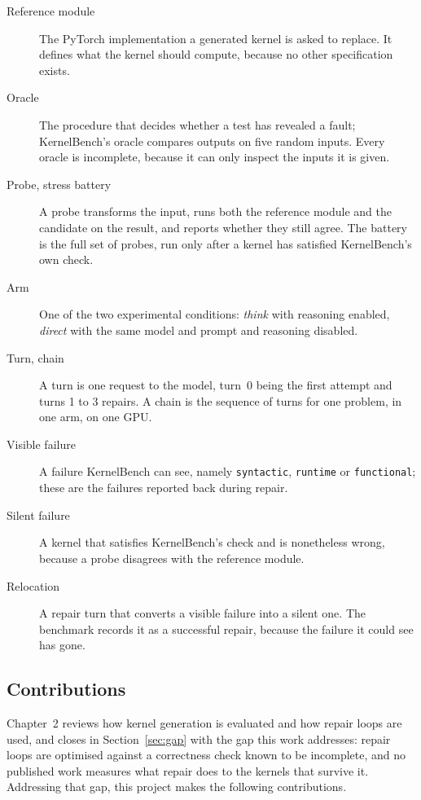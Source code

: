 \documentclass[12pt]{article}
\begin{document}
\begin{description}

\item[Reference module] The PyTorch implementation a generated kernel is asked
to replace. It defines what the kernel should compute, because no other
specification exists.

\item[Oracle] The procedure that decides whether a test has revealed a fault;
KernelBench's oracle compares outputs on five random inputs. Every oracle is
incomplete, because it can only inspect the inputs it is given.

\item[Probe, stress battery] A probe transforms the input, runs both the
reference module and the candidate on the result, and reports whether they
still agree. The battery is the full set of probes, run only after a kernel has
satisfied KernelBench's own check.

\item[Arm] One of the two experimental conditions: \emph{think} with reasoning
enabled, \emph{direct} with the same model and prompt and reasoning disabled.

\item[Turn, chain] A turn is one request to the model, turn~0 being the first
attempt and turns 1 to 3 repairs. A chain is the sequence of turns for one
problem, in one arm, on one GPU.

\item[Visible failure] A failure KernelBench can see, namely
\texttt{syntactic}, \texttt{runtime} or \texttt{functional}; these are the
failures reported back during repair.

\item[Silent failure] A kernel that satisfies KernelBench's check and is
nonetheless wrong, because a probe disagrees with the reference module.

\item[Relocation] A repair turn that converts a visible failure into a silent
one. The benchmark records it as a successful repair, because the failure it
could see has gone.

\end{description}

\subsection{Contributions}

Chapter~2 reviews how kernel generation is evaluated and how repair loops are
used, and closes in Section~\ref{sec:gap} with the gap this work addresses:
repair loops are optimised against a correctness check known to be incomplete,
and no published work measures what repair does to the kernels that survive it.
Addressing that gap, this project makes the following contributions.
\end{document}
